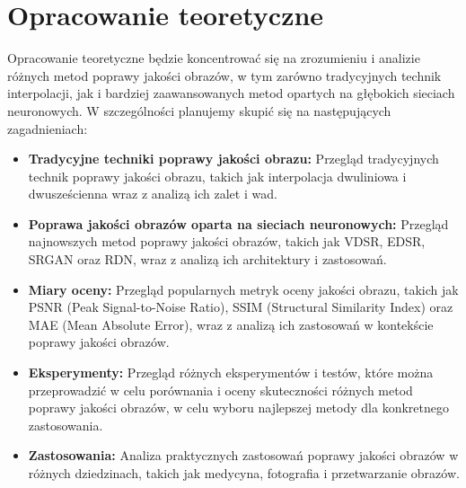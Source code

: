\documentclass[10pt]{article}
\begin{document}
\section*{Opracowanie teoretyczne}
Opracowanie teoretyczne będzie koncentrować się na zrozumieniu i analizie różnych metod poprawy jakości obrazów, w tym zarówno tradycyjnych technik interpolacji, jak i bardziej zaawansowanych metod opartych na głębokich sieciach neuronowych. W szczególności planujemy skupić się na następujących zagadnieniach:
\begin{itemize}
    \item \textbf{Tradycyjne techniki poprawy jakości obrazu:} Przegląd tradycyjnych technik poprawy jakości obrazu, takich jak interpolacja dwuliniowa i dwusześcienna wraz z analizą ich zalet i wad.
    \item \textbf{Poprawa jakości obrazów oparta na sieciach neuronowych:} Przegląd najnowszych metod poprawy jakości obrazów, takich jak VDSR, EDSR, SRGAN oraz RDN, wraz z analizą ich architektury i zastosowań.
    \item \textbf{Miary oceny:} Przegląd popularnych metryk oceny jakości obrazu, takich jak PSNR (Peak Signal-to-Noise Ratio), SSIM (Structural Similarity Index) oraz MAE (Mean Absolute Error), wraz z analizą ich zastosowań w kontekście poprawy jakości obrazów.
    \item \textbf{Eksperymenty:} Przegląd różnych eksperymentów i testów, które można przeprowadzić w celu porównania i oceny skuteczności różnych metod poprawy jakości obrazów, w celu wyboru najlepszej metody dla konkretnego zastosowania.
    \item \textbf{Zastosowania:} Analiza praktycznych zastosowań poprawy jakości obrazów w różnych dziedzinach, takich jak medycyna, fotografia i przetwarzanie obrazów.
\end{itemize}

\newpage
\end{document}
